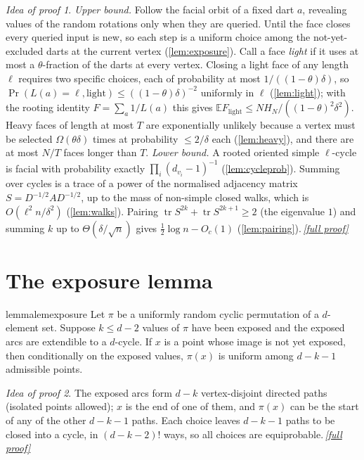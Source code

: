 \documentclass[11pt,a4paper]{article}
\theoremstyle{plain}
\theoremstyle{definition}
\theoremstyle{remark}
\newtheorem*{proofidea}{Idea of proof}
\newcommand{\fullproofref}[1]{\,\hyperref[#1]{\textit{[full proof]}}}
\newcommand{\E}{\mathbb E}
\DeclareMathOperator{\tr}{tr}
\newcommand{\Flight}{F_{\mathrm{light}}}
\begin{document}
\begin{proofidea}
\emph{Upper bound.} Follow the facial orbit of a fixed dart $a$, revealing values of the random rotations only when they are queried. Until the face closes every queried input is new, so each step is a uniform choice among the not-yet-excluded darts at the current vertex (\cref{lem:exposure}). Call a face \emph{light} if it uses at most a $\theta$-fraction of the darts at every vertex. Closing a light face of any length $\ell$ requires two specific choices, each of probability at most $1/((1-\theta)\delta)$, so $\Pr(L(a)=\ell,\text{light})\le((1-\theta)\delta)^{-2}$ uniformly in $\ell$ (\cref{lem:light}); with the rooting identity $F=\sum_a1/L(a)$ this gives $\E\Flight\le NH_N/((1-\theta)^2\delta^2)$. Heavy faces of length at most $T$ are exponentially unlikely because a vertex must be selected $\Omega(\theta\delta)$ times at probability $\le2/\delta$ each (\cref{lem:heavy}), and there are at most $N/T$ faces longer than $T$. \emph{Lower bound.} A rooted oriented simple $\ell$-cycle is facial with probability exactly $\prod_i(d_{v_i}-1)^{-1}$ (\cref{lem:cycleprob}). Summing over cycles is a trace of a power of the normalised adjacency matrix $S=D^{-1/2}AD^{-1/2}$, up to the mass of non-simple closed walks, which is $O(\ell^2n/\delta^2)$ (\cref{lem:walks}). Pairing $\tr S^{2k}+\tr S^{2k+1}\ge2$ (the eigenvalue $1$) and summing $k$ up to $\Theta(\delta/\sqrt n)$ gives $\tfrac12\log n-O_c(1)$ (\cref{lem:pairing}).\fullproofref{pf:main}
\end{proofidea}

\section{The exposure lemma}\label{sec:exposure}

\begin{restatable}{lemma}{lemexposure}\label{lem:exposure}
Let $\pi$ be a uniformly random cyclic permutation of a $d$-element set. Suppose $k\le d-2$ values of $\pi$ have been exposed and the exposed arcs are extendible to a $d$-cycle. If $x$ is a point whose image is not yet exposed, then conditionally on the exposed values, $\pi(x)$ is uniform among $d-k-1$ admissible points.
\end{restatable}
\begin{proofidea}
The exposed arcs form $d-k$ vertex-disjoint directed paths (isolated points allowed); $x$ is the end of one of them, and $\pi(x)$ can be the start of any of the other $d-k-1$ paths. Each choice leaves $d-k-1$ paths to be closed into a cycle, in $(d-k-2)!$ ways, so all choices are equiprobable.\fullproofref{pf:exposure}
\end{proofidea}
\end{document}
